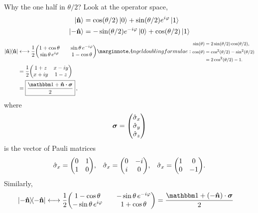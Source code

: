 \noindent Why the one half in $\theta/2$? Look at the operator space,
\begin{align}
	\ket{\bf \hat n} &= \cos(\theta/2) \ket{0} + \sin(\theta/2) e^{i\varphi} \ket{1} \\
	\ket{\bf -\hat n} &= -\sin(\theta/2)e^{-i\varphi} \ket{0} + \cos(\theta/2) \ket{1}
\end{align}
\begin{align}
	\dyad{\bf \hat n} &\longleftrightarrow \frac{1}{2} \mqty(1+\cos\theta && \sin\theta\,e^{-i\varphi} \\ \sin\theta\,e^{i\varphi} && 1-\cos\theta)  \mnf{Angel doubling formulae: 
	\begin{align*}
	\sin(\theta) &= 2\sin(\theta/2)\cos(\theta/2), \\
	\cos(\theta) &= \cos^2(\theta/2) - \sin^2(\theta/2) \\ 
	&= 2\cos^2(\theta/2) - 1.	
	\end{align*}} \\
	&= \frac{1}{2}\mqty(1+z & x-iy \\ x+iy & 1-z) \\
	&= \boxed{\frac{\id + \boldsymbol{\hat n \cdot \sigma}}{2}}\, , 
\end{align}
where 
\begin{align}
	\boldsymbol{\sigma} = \mqty(\hat\sigma_x \\ \hat\sigma_y \\ \hat\sigma_z)
\end{align}
is the vector of Pauli matrices
\begin{align}
	\hat\sigma_x = \mqty(0&1\\1&0), &&  \hat\sigma_x = \mqty(0&-i\\i&0), && \hat\sigma_x = \mqty(1&0\\0&-1).
\end{align}
Similarly,
\begin{align}
	\dyad{\bf -\hat n} &\longleftrightarrow \frac{1}{2} \mqty(1-\cos\theta && -\sin\theta\,e^{-i\varphi} \\ -\sin\theta\,e^{i\varphi} && 1+\cos\theta) = \frac{\id + {(-\boldsymbol{\hat n}) \cdot \boldsymbol\sigma}}{2} 
\end{align}

